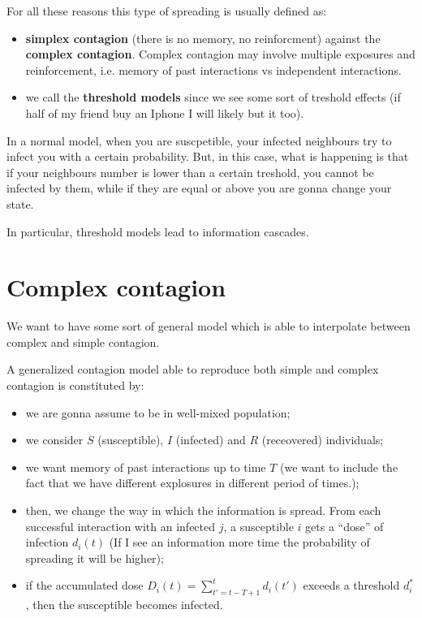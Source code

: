 \documentclass[../main/main.tex]{subfiles}
\begin{document}
For all these reasons this type of spreading is usually defined as:
\begin{itemize}
\item \textbf{simplex contagion} (there is no memory, no reinforcment) against the \textbf{complex contagion}. Complex contagion may involve multiple exposures and reinforcement, i.e. memory of past interactions vs independent interactions.

\item we call the \textbf{threshold models} since we see some sort of treshold effects (if half of my friend buy an Iphone I will likely but it too).

\end{itemize}

In a normal model, when you are suscpetible, your infected neighbours try to infect you with a certain probability. But, in this case, what is happening is that if your neighbours number is lower than a certain treshold, you cannot be infected by them, while if they are equal or above you are gonna change your state.

In particular, threshold models lead to information cascades.


\section{Complex contagion}

We want to have some sort of general model which is able to interpolate between complex and simple contagion.

A generalized contagion model able to reproduce both simple and complex contagion is constituted by:
\begin{itemize}
\item we are gonna assume to be in well-mixed population;
\item we consider \( S \) (susceptible), \( I \) (infected) and \( R \) (receovered) individuals;
\item we want memory of past interactions up to time $T$ (we want to include the fact that we have different explosures in different period of times.);

\item then, we change the way in which the information is spread. From each successful interaction with an infected $j$, a susceptible $i$ gets a “dose” of infection $d_i(t)$ (If I see an information more time the probability of spreading it will be higher);

\item if the accumulated dose $D_i(t) = \sum_{t'=t-T+1}^{t} d_i(t')$ exceeds a threshold $d_i^*$, then the susceptible becomes infected.

\end{itemize}
\end{document}
